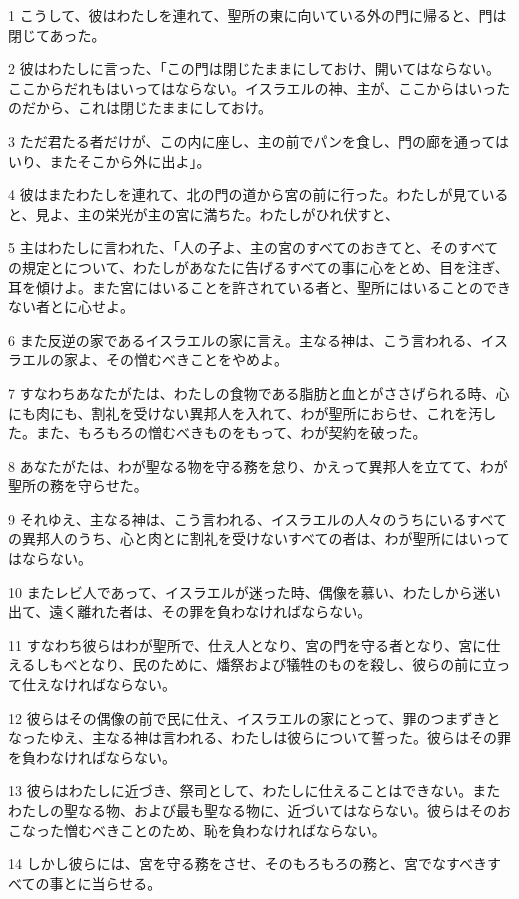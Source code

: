\par 1 こうして、彼はわたしを連れて、聖所の東に向いている外の門に帰ると、門は閉じてあった。
\par 2 彼はわたしに言った、「この門は閉じたままにしておけ、開いてはならない。ここからだれもはいってはならない。イスラエルの神、主が、ここからはいったのだから、これは閉じたままにしておけ。
\par 3 ただ君たる者だけが、この内に座し、主の前でパンを食し、門の廊を通ってはいり、またそこから外に出よ」。
\par 4 彼はまたわたしを連れて、北の門の道から宮の前に行った。わたしが見ていると、見よ、主の栄光が主の宮に満ちた。わたしがひれ伏すと、
\par 5 主はわたしに言われた、「人の子よ、主の宮のすべてのおきてと、そのすべての規定とについて、わたしがあなたに告げるすべての事に心をとめ、目を注ぎ、耳を傾けよ。また宮にはいることを許されている者と、聖所にはいることのできない者とに心せよ。
\par 6 また反逆の家であるイスラエルの家に言え。主なる神は、こう言われる、イスラエルの家よ、その憎むべきことをやめよ。
\par 7 すなわちあなたがたは、わたしの食物である脂肪と血とがささげられる時、心にも肉にも、割礼を受けない異邦人を入れて、わが聖所におらせ、これを汚した。また、もろもろの憎むべきものをもって、わが契約を破った。
\par 8 あなたがたは、わが聖なる物を守る務を怠り、かえって異邦人を立てて、わが聖所の務を守らせた。
\par 9 それゆえ、主なる神は、こう言われる、イスラエルの人々のうちにいるすべての異邦人のうち、心と肉とに割礼を受けないすべての者は、わが聖所にはいってはならない。
\par 10 またレビ人であって、イスラエルが迷った時、偶像を慕い、わたしから迷い出て、遠く離れた者は、その罪を負わなければならない。
\par 11 すなわち彼らはわが聖所で、仕え人となり、宮の門を守る者となり、宮に仕えるしもべとなり、民のために、燔祭および犠牲のものを殺し、彼らの前に立って仕えなければならない。
\par 12 彼らはその偶像の前で民に仕え、イスラエルの家にとって、罪のつまずきとなったゆえ、主なる神は言われる、わたしは彼らについて誓った。彼らはその罪を負わなければならない。
\par 13 彼らはわたしに近づき、祭司として、わたしに仕えることはできない。またわたしの聖なる物、および最も聖なる物に、近づいてはならない。彼らはそのおこなった憎むべきことのため、恥を負わなければならない。
\par 14 しかし彼らには、宮を守る務をさせ、そのもろもろの務と、宮でなすべきすべての事とに当らせる。
